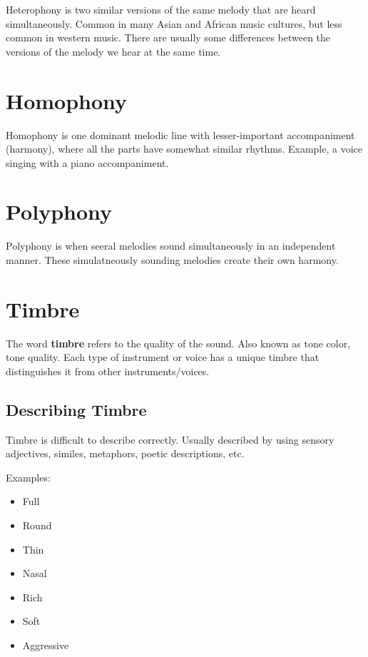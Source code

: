 \documentclass[12pt, a4paper]{report}
\begin{document}
  Heterophony is two similar versions of the same melody that are heard simultaneously. Common in many Asian and African music cultures, but less common in western music. There are usually some differences between the versions of the melody we hear at the same time.

  \section{Homophony}

  Homophony is one dominant melodic line with lesser-important accompaniment (harmony), where all the parts have somewhat similar rhythms. Example, a voice singing with a piano accompaniment.

  \section{Polyphony}

  Polyphony is when seeral melodies sound simultaneously in an independent manner. These simulatneously sounding melodies create their own harmony.

  \section{Timbre}

  The word \textbf{timbre} refers to the quality of the sound. Also known as tone color, tone quality. Each type of instrument or voice has a unique timbre that distinguishes it from other instruments/voices.

  \newpage

  \subsection{Describing Timbre}

  Timbre is difficult to describe correctly. Usually described by using sensory adjectives, similes, metaphors, poetic descriptions, etc.

  Examples:

  \begin{itemize}
    \item Full
    \item Round
    \item Thin
    \item Nasal
    \item Rich
    \item Soft
    \item Aggressive
  \end{itemize}
\end{document}
